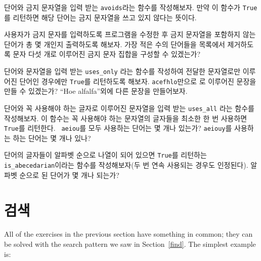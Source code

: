 \documentclass[10pt]{book}
\begin{document}
\begin{exercise} 

  단어와 금지 문자열을 입력 받는 {\tt avoids}라는 함수를 작성해보자.
  만약 이 함수가 {\tt True}를 리턴하면 해당 단어는 금지 문자열을 쓰고
  있지 않다는 뜻이다.

  사용자가 금지 문자를 입력하도록 프로그램을 수정한 후 금지 문자열을
  포함하지 않는 단어가 총 몇 개인지 출력하도록 해보자.  가장 적은 수의
  단어들을 목록에서 제거하도록 문자 다섯 개로 이루어진 금지 문자 집합을
  구성할 수 있겠는가?

\end{exercise}



\begin{exercise}

  단어와 문자열을 입력 받는 \verb"uses_only" 라는 함수를 작성하여
  전달한 문자열로만 이루어진 단어인 경우에만 {\tt True}를 리턴하도록
  해보자. {\tt acefhlo}만으로 로 이루어진 문장을 만들 수 있겠는가?
  ``Hoe alfalfa''외에 다른 문장을 만들어보자.

\end{exercise}


\begin{exercise} 

  단어와 꼭 사용해야 하는 글자로 이루어진 문자열을 입력 받는
  \verb"uses_all" 라는 함수를 작성해보자. 이 함수는 꼭 사용해야 하는
  문자열의 글자들을 최소한 한 번 사용하면 {\tt True}를 리턴한다.  {\tt
    aeiou}를 모두 사용하는 단어는 몇 개나 있는가? {\tt aeiouy}를
  사용하는 하는 단어는 몇 개나 있나?

\end{exercise}


\begin{exercise}

  단어의 글자들이 알파벳 순으로 나열이 되어 있으면 {\tt True}를
  리턴하는 \verb"is_abecedarian"이라는 함수를 작성해보자(두 번 연속
  사용되는 경우도 인정된다).  알파벳 순으로 된 단어가 몇 개나 되는가?


\end{exercise}



\section{검색}
\label{search}

All of the exercises in the previous section have something
in common; they can be solved with the search pattern we saw
in Section~\ref{find}.  The simplest example is:
\end{document}
